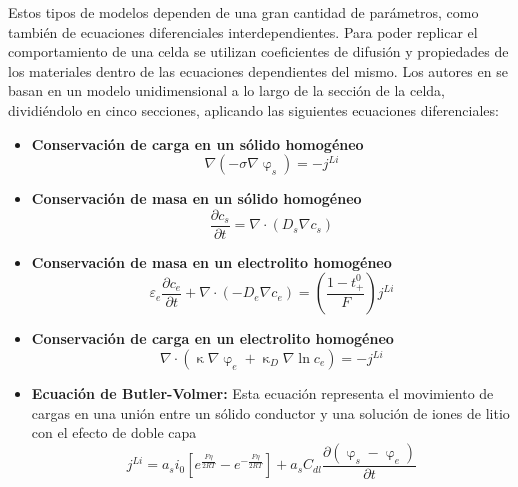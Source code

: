 \noindent Estos tipos de modelos dependen de una gran cantidad de par\'ametros,
como tambi\'en de ecuaciones diferenciales interdependientes. Para poder 
replicar el comportamiento de una celda se utilizan coeficientes de difusi\'on y 
propiedades de los materiales dentro de las ecuaciones dependientes del mismo. 
Los autores en \cite{Li2016} se basan en un modelo unidimensional a lo largo de 
la secci\'on de la celda, dividiéndolo en cinco secciones, aplicando las 
siguientes ecuaciones diferenciales: 

\begin{itemize}
    \item \textbf{Conservaci\'on de carga en un s\'olido homog\'eneo}
        \begin{equation}
            \nabla (-\sigma\nabla\upvarphi_s)=-j^{Li} 
            \label{Chrg_cons_hom_sol}
        \end{equation}	
    \item \textbf{Conservaci\'on de masa en un s\'olido homog\'eneo}
        \begin{equation}
            \frac{\partial c_s}{\partial t}=\nabla \cdot (D_s\nabla c_s) 
            \label{Mass_cons_hom_sol}
        \end{equation}	
    \item \textbf{Conservaci\'on de masa en un electrolito homog\'eneo}
        \begin{equation}
            \varepsilon_e\frac{\partial c_e}{\partial t} + \nabla \cdot
            (-D_e\nabla c_e) = \left(\frac{1-t_+^0}{F}\right)j^{Li}
            \label{Mass_cons_hom_electrolyte}
        \end{equation}	
    \item \textbf{Conservaci\'on de carga en un electrolito homog\'eneo}
        \begin{equation}
            \nabla \cdot (\upkappa \nabla \upvarphi_e + \upkappa_D \nabla \ln 
            c_e) = -j^{Li}
            \label{Chrg_cons_hom_electrolyte}
        \end{equation}	
    \item \textbf{Ecuaci\'on de Butler-Volmer:} Esta ecuaci\'on representa el
        movimiento de cargas en una uni\'on entre un s\'olido conductor y una
        soluci\'on de iones de litio con el efecto de doble capa
        \begin{equation}
            j^{Li} =
            a_si_0\left[{e^\frac{F\eta}{2RT}-e^{-\frac{F\eta}{2RT}}}\right] + 
            a_sC_{dl}\frac{\partial{(\upvarphi_s - \upvarphi_e)}}{\partial t}
            \label{Butler_Volmer_kinetics}
        \end{equation}	
\end{itemize}

